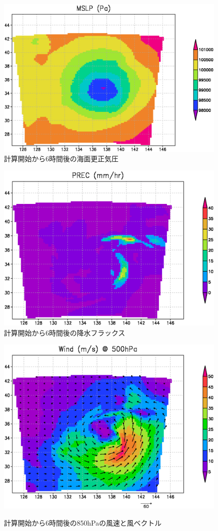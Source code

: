 \begin{figure}[h]
\begin{center}
  \includegraphics[width=0.55\hsize]{./figure/real_mslp.eps}\\
  \caption{計算開始から6時間後の海面更正気圧}
  \label{fig:real_mslp}
\end{center}
\begin{center}
  \includegraphics[width=0.55\hsize]{./figure/real_prec.eps}\\
  \caption{計算開始から6時間後の降水フラックス}
  \label{fig:real_prec}
\end{center}
\begin{center}
  \includegraphics[width=0.55\hsize]{./figure/real_wind.eps}\\
  \caption{計算開始から6時間後の850hPaの風速と風ベクトル}
  \label{fig:real_wind}
\end{center}
\end{figure}

